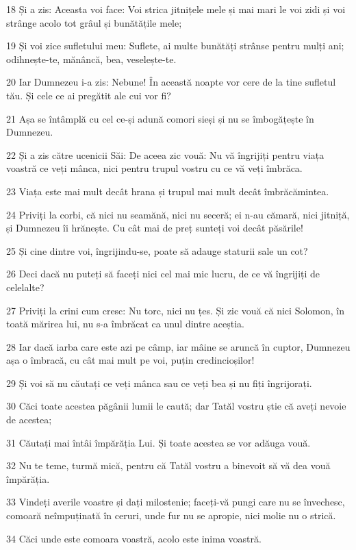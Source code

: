 \par 18 Și a zis: Aceasta voi face: Voi strica jitnițele mele și mai mari le voi zidi și voi strânge acolo tot grâul și bunătățile mele;
\par 19 Și voi zice sufletului meu: Suflete, ai multe bunătăți strânse pentru mulți ani; odihnește-te, mănâncă, bea, veselește-te.
\par 20 Iar Dumnezeu i-a zis: Nebune! În această noapte vor cere de la tine sufletul tău. Și cele ce ai pregătit ale cui vor fi?
\par 21 Așa se întâmplă cu cel ce-și adună comori sieși și nu se îmbogățește în Dumnezeu.
\par 22 Și a zis către ucenicii Săi: De aceea zic vouă: Nu vă îngrijiți pentru viața voastră ce veți mânca, nici pentru trupul vostru cu ce vă veți îmbrăca.
\par 23 Viața este mai mult decât hrana și trupul mai mult decât îmbrăcămintea.
\par 24 Priviți la corbi, că nici nu seamănă, nici nu seceră; ei n-au cămară, nici jitniță, și Dumnezeu îi hrănește. Cu cât mai de preț sunteți voi decât păsările!
\par 25 Și cine dintre voi, îngrijindu-se, poate să adauge staturii sale un cot?
\par 26 Deci dacă nu puteți să faceți nici cel mai mic lucru, de ce vă îngrijiți de celelalte?
\par 27 Priviți la crini cum cresc: Nu torc, nici nu țes. Și zic vouă că nici Solomon, în toată mărirea lui, nu s-a îmbrăcat ca unul dintre aceștia.
\par 28 Iar dacă iarba care este azi pe câmp, iar mâine se aruncă în cuptor, Dumnezeu așa o îmbracă, cu cât mai mult pe voi, puțin credincioșilor!
\par 29 Și voi să nu căutați ce veți mânca sau ce veți bea și nu fiți îngrijorați.
\par 30 Căci toate acestea păgânii lumii le caută; dar Tatăl vostru știe că aveți nevoie de acestea;
\par 31 Căutați mai întâi împărăția Lui. Și toate acestea se vor adăuga vouă.
\par 32 Nu te teme, turmă mică, pentru că Tatăl vostru a binevoit să vă dea vouă împărăția.
\par 33 Vindeți averile voastre și dați milostenie; faceți-vă pungi care nu se învechesc, comoară neîmpuținată în ceruri, unde fur nu se apropie, nici molie nu o strică.
\par 34 Căci unde este comoara voastră, acolo este inima voastră.
